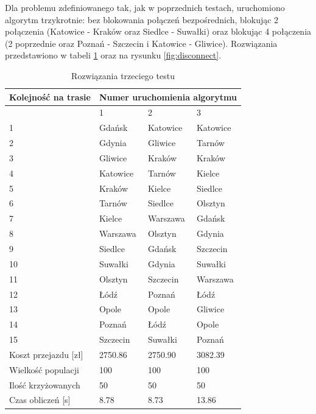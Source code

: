 \documentclass[12pt, oneside, final]{report}
\begin{document}
Dla problemu zdefiniowanego tak, jak w poprzednich testach, uruchomiono algorytm trzykrotnie: bez blokowania połączeń bezpośrednich, blokując 2 połączenia (Katowice - Kraków oraz Siedlce - Suwałki) oraz blokując 4 połączenia (2 poprzednie oraz Poznań - Szczecin i Katowice - Gliwice). Rozwiązania przedstawiono w tabeli \ref{tab:results-disconnect} oraz na rysunku \ref{fig:disconnect}.
\begin{table}[ht!]
\caption{Rozwiązania trzeciego testu}
\label{tab:results-disconnect}
\centering
\begin{tabular}{llll}
\hline 
Kolejność na trasie & \multicolumn{3}{c}{Numer uruchomienia algorytmu}\\
\hline
						& 1 & 2 & 3\\
\hline
1 						& Gdańsk	& Katowice	& Katowice\\
2						& Gdynia	& Gliwice	& Tarnów\\
3						& Gliwice	& Kraków	& Kraków\\
4						& Katowice	& Tarnów	& Kielce\\
5						& Kraków	& Kielce	& Siedlce\\
6						& Tarnów	& Siedlce	& Olsztyn\\
7						& Kielce	& Warszawa	& Gdańsk\\
8						& Warszawa	& Olsztyn	& Gdynia\\
9						& Siedlce	& Gdańsk	& Szczecin\\
10						& Suwałki	& Gdynia	& Suwałki\\
11						& Olsztyn	& Szczecin	& Warszawa\\
12						& Łódź		& Poznań	& Łódź\\
13						& Opole		& Opole		& Gliwice\\
14						& Poznań	& Łódź		& Opole\\
15						& Szczecin	& Suwałki	& Poznań\\
\hline
Koszt przejazdu [zł]	& 2750.86	& 2750.90 	& 3082.39\\
\hline
Wielkość populacji		& 100		& 100 	& 100\\
\hline
Ilość krzyżowanych		& 50		& 50 	& 50\\
\hline
Czas obliczeń [s]		& 8.78		& 8.73 	& 13.86\\
\hline

\end{tabular}
\end{table}
\end{document}
